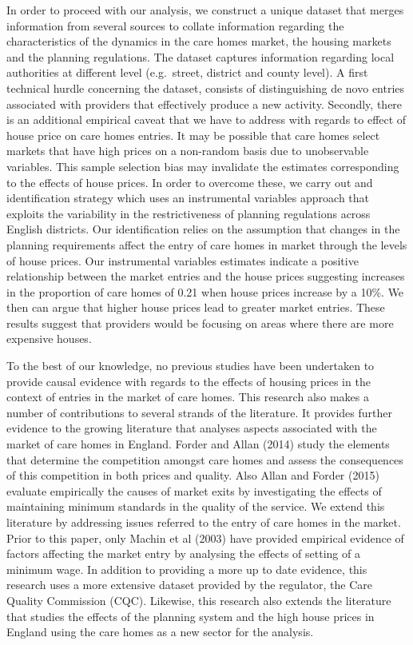 \documentclass[11pt,a4paper,]{article}
\begin{document}
In order to proceed with our analysis, we construct a unique dataset
that merges information from several sources to collate information
regarding the characteristics of the dynamics in the care homes market,
the housing markets and the planning regulations. The dataset captures
information regarding local authorities at different level (e.g.~street,
district and county level). A first technical hurdle concerning the
dataset, consists of distinguishing de novo entries associated with
providers that effectively produce a new activity. Secondly, there is an
additional empirical caveat that we have to address with regards to
effect of house price on care homes entries. It may be possible that
care homes select markets that have high prices on a non-random basis
due to unobservable variables. This sample selection bias may invalidate
the estimates corresponding to the effects of house prices. In order to
overcome these, we carry out and identification strategy which uses an
instrumental variables approach that exploits the variability in the
restrictiveness of planning regulations across English districts. Our
identification relies on the assumption that changes in the planning
requirements affect the entry of care homes in market through the levels
of house prices. Our instrumental variables estimates indicate a
positive relationship between the market entries and the house prices
suggesting increases in the proportion of care homes of 0.21 when house
prices increase by a 10\%. We then can argue that higher house prices
lead to greater market entries. These results suggest that providers
would be focusing on areas where there are more expensive houses.

To the best of our knowledge, no previous studies have been undertaken
to provide causal evidence with regards to the effects of housing prices
in the context of entries in the market of care homes. This research
also makes a number of contributions to several strands of the
literature. It provides further evidence to the growing literature that
analyses aspects associated with the market of care homes in England.
Forder and Allan (2014) study the elements that determine the
competition amongst care homes and assess the consequences of this
competition in both prices and quality. Also Allan and Forder (2015)
evaluate empirically the causes of market exits by investigating the
effects of maintaining minimum standards in the quality of the service.
We extend this literature by addressing issues referred to the entry of
care homes in the market. Prior to this paper, only Machin et al (2003)
have provided empirical evidence of factors affecting the market entry
by analysing the effects of setting of a minimum wage. In addition to
providing a more up to date evidence, this research uses a more
extensive dataset provided by the regulator, the Care Quality Commission
(CQC). Likewise, this research also extends the literature that studies
the effects of the planning system and the high house prices in England
using the care homes as a new sector for the analysis.
\end{document}
